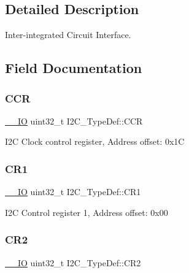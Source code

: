 \subsection{Detailed Description}
Inter-\/integrated Circuit Interface. 

\subsection{Field Documentation}
\mbox{\label{struct_i2_c___type_def_a4d81b61d23a54d0d1e28646c3bb9aac5}} 
\subsubsection{\texorpdfstring{C\+CR}{CCR}}
{\footnotesize\ttfamily \hyperlink{core__sc300_8h_aec43007d9998a0a0e01faede4133d6be}{\+\_\+\+\_\+\+IO} uint32\+\_\+t I2\+C\+\_\+\+Type\+Def\+::\+C\+CR}

I2C Clock control register, Address offset\+: 0x1C \mbox{\label{struct_i2_c___type_def_a91782f7b81475b0e3c3779273abd26aa}} 
\subsubsection{\texorpdfstring{C\+R1}{CR1}}
{\footnotesize\ttfamily \hyperlink{core__sc300_8h_aec43007d9998a0a0e01faede4133d6be}{\+\_\+\+\_\+\+IO} uint32\+\_\+t I2\+C\+\_\+\+Type\+Def\+::\+C\+R1}

I2C Control register 1, Address offset\+: 0x00 \mbox{\label{struct_i2_c___type_def_a29eb47db03d5ad7e9b399f8895f1768c}} 
\subsubsection{\texorpdfstring{C\+R2}{CR2}}
{\footnotesize\ttfamily \hyperlink{core__sc300_8h_aec43007d9998a0a0e01faede4133d6be}{\+\_\+\+\_\+\+IO} uint32\+\_\+t I2\+C\+\_\+\+Type\+Def\+::\+C\+R2}

